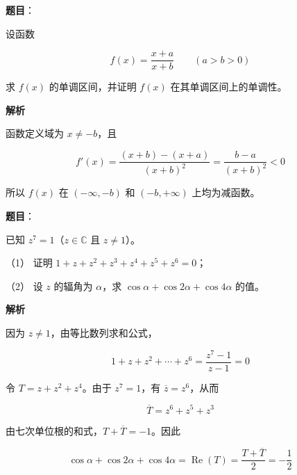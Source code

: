 \begin{answer}

\textbf{题目}：

设函数

\nopagebreak[4]
\[
f(x)=\frac{x+a}{x+b}\qquad(a>b>0)
\]

求 $f(x)$ 的单调区间，并证明 $f(x)$ 在其单调区间上的单调性。

\textbf{解析}

函数定义域为 $x\ne-b$，且

\nopagebreak[4]
\[
f'(x)=\frac{(x+b)-(x+a)}{(x+b)^2}
=\frac{b-a}{(x+b)^2}<0
\]

所以 $f(x)$ 在 $(-\infty,-b)$ 和 $(-b,+\infty)$ 上均为减函数。


\end{answer}
\begin{answer}

\textbf{题目}：

已知 $z^7=1$（$z\in\mathbb C$ 且 $z\ne1$）。

（1） 证明 $1+z+z^2+z^3+z^4+z^5+z^6=0$；

（2） 设 $z$ 的辐角为 $\alpha$，求 $\cos\alpha+\cos2\alpha+\cos4\alpha$ 的值。

\textbf{解析}


因为 $z\ne1$，由等比数列求和公式，

\nopagebreak[4]
\[
1+z+z^2+\cdots+z^6=\frac{z^7-1}{z-1}=0
\]


令 $T=z+z^2+z^4$。由于 $z^7=1$，有 $\overline z=z^6$，从而

\nopagebreak[4]
\[
\overline T=z^6+z^5+z^3
\]

由七次单位根的和式，$T+\overline T=-1$。因此

\nopagebreak[4]
\[
\cos\alpha+\cos2\alpha+\cos4\alpha
=\operatorname{Re}(T)
=\frac{T+\overline T}{2}
=-\frac12
\]



\end{answer}
